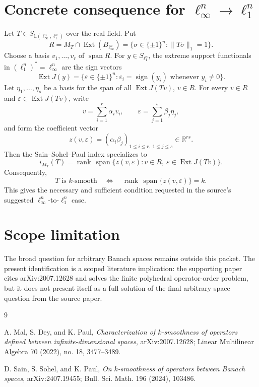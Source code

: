 \documentclass[11pt]{article}
\newcommand{\R}{\mathbb R}
\newcommand{\Lin}{\mathbb L}
\newcommand{\Ext}{\operatorname{Ext}}
\newcommand{\spanop}{\operatorname{span}}
\newcommand{\rank}{\operatorname{rank}}
\begin{document}
\section*{Concrete consequence for \(\ell_\infty^n\to\ell_1^n\)}

Let \(T\in S_{\Lin(\ell_\infty^n,\ell_1^n)}\) over the real field.  Put
\[
  R=M_T\cap \Ext(B_{\ell_\infty^n})
    =\{\sigma\in\{\pm1\}^n:\|T\sigma\|_1=1\}.
\]
Choose a basis \(v_1,\ldots,v_r\) of \(\spanop R\).  For
\(y\in S_{\ell_1^n}\), the extreme support functionals in
\((\ell_1^n)^*=\ell_\infty^n\) are the sign vectors
\[
  \Ext J(y)=
  \{\varepsilon\in\{\pm1\}^n:
      \varepsilon_i=\operatorname{sign}(y_i)\text{ whenever }y_i\neq0\}.
\]
Let \(\eta_1,\ldots,\eta_s\) be a basis for the span of all
\(\Ext J(Tv)\), \(v\in R\).  For every \(v\in R\) and
\(\varepsilon\in\Ext J(Tv)\), write
\[
  v=\sum_{i=1}^r \alpha_i v_i,\qquad
  \varepsilon=\sum_{j=1}^s \beta_j \eta_j,
\]
and form the coefficient vector
\[
  z(v,\varepsilon)=(\alpha_i\beta_j)_{1\leq i\leq r,\;1\leq j\leq s}
  \in \R^{rs}.
\]
Then the Sain--Sohel--Paul index specializes to
\[
  i_{M_T}(T)=
  \rank\,\spanop\{z(v,\varepsilon):
          v\in R,\ \varepsilon\in\Ext J(Tv)\}.
\]
Consequently,
\[
  T\text{ is }k\text{-smooth}
  \quad\Longleftrightarrow\quad
  \rank\,\spanop\{z(v,\varepsilon)\}=k.
\]
This gives the necessary and sufficient condition requested in the
source's suggested \(\ell_\infty^n\)-to-\(\ell_1^n\) case.

\section*{Scope limitation}

The broad question for arbitrary Banach spaces remains outside this
packet.  The present identification is a scoped literature implication:
the supporting paper cites arXiv:2007.12628 and solves the finite
polyhedral operator-order problem, but it does not present itself as a
full solution of the final arbitrary-space question from the source
paper.

\begin{thebibliography}{9}

A. Mal, S. Dey, and K. Paul,
\emph{Characterization of \(k\)-smoothness of operators defined between
infinite-dimensional spaces},
arXiv:2007.12628; Linear Multilinear Algebra 70 (2022), no. 18,
3477--3489.

D. Sain, S. Sohel, and K. Paul,
\emph{On \(k\)-smoothness of operators between Banach spaces},
arXiv:2407.19455; Bull. Sci. Math. 196 (2024), 103486.

\end{thebibliography}
\end{document}
